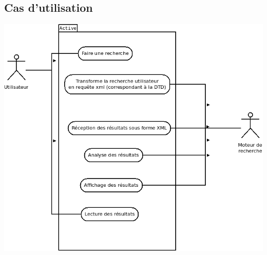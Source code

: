 \documentclass[a4paper,12pt]{report}
\begin{document}
\subsection{Cas d'utilisation}\label{utilisation-recherche}
\begin{center}
\includegraphics[scale=0.5]{"images/cas_utilisation_recherche"}
\end{center}
\end{document}

